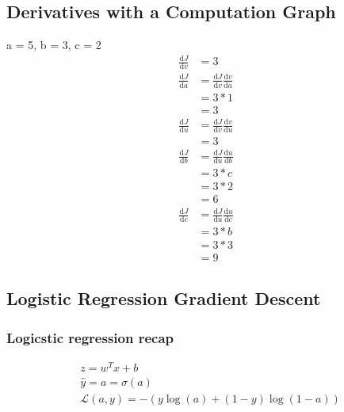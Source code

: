 \subsection{Derivatives with a Computation Graph}
a = 5, b = 3, c = 2
\begin{align}
	\frac{\mathrm{d}J}{\mathrm{d}v} &= 3 \\
	\frac{\mathrm{d}J}{\mathrm{d}a} &= \frac{\mathrm{d}J}{\mathrm{d}v} \frac{\mathrm{d}v}{\mathrm{d}a} \\
	&= 3 * 1 \\
	&= 3 \\
	\frac{\mathrm{d}J}{\mathrm{d}u} &= \frac{\mathrm{d}J}{\mathrm{d}v} \frac{\mathrm{d}v}{\mathrm{d}u} \\ 
	&= 3 \\
	\frac{\mathrm{d}J}{\mathrm{d}b} &= \frac{\mathrm{d}J}{\mathrm{d}u} \frac{\mathrm{d}u}{\mathrm{d}b} \\
	&= 3 * c \\
	&= 3 * 2 \\
	&= 6 \\
	\frac{\mathrm{d}J}{\mathrm{d}c} &= \frac{\mathrm{d}J}{\mathrm{d}u} \frac{\mathrm{d}u}{\mathrm{d}c} \\
	&= 3 * b \\
	&= 3 * 3 \\
	&= 9
\end{align}


\subsection{Logistic Regression Gradient Descent}
\subsubsection{Logicstic regression recap}
\begin{align}
	&z = w^Tx + b \\
	&\hat{y} = a = \sigma(a) \\
	&\mathcal{L}(a, y) = -(y\log(a) + (1-y)\log(1 - a))
\end{align}

